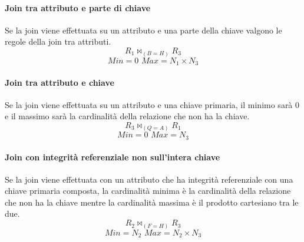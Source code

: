 \documentclass{article}
\newcommand{\join}{\mathbin{\bowtie}} %
\begin{document}
\paragraph{Join tra attributo e parte di chiave}
Se la join viene effettuata su un attributo e una parte della chiave valgono le regole della join tra attributi.
\[
R_1\join_{(B = H)} R_3
\]
$$Min=0\,\,Max=N_1 \times N_3$$
\paragraph{Join tra attributo e chiave}
Se la join viene effettuata su un attributo e una chiave primaria, il minimo sarà 0 e il massimo sarà la cardinalità della relazione che non ha la chiave.
\[
R_3\join_{(Q = A)} R_1
\]
$$Min=0\,\,Max=N_3$$
\paragraph{Join con integrità referenziale non sull'intera chiave}
Se la join viene effettuata con un attributo che ha integrità referenziale con una chiave primaria composta, la cardinalità minima è la cardinalità della relazione che non ha la chiave mentre la cardinalità massima è il prodotto cartesiano tra le due.
\[
R_2\join_{(F = H)} R_3
\]
$$Min=N_2\,\,Max=N_2 \times N_3$$
\end{document}
